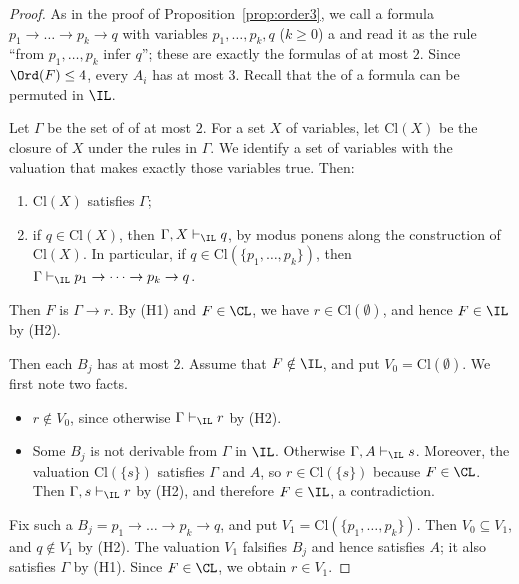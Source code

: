 \begin{proof}
As in the proof of Proposition~\ref{prop:order3}, we call a formula
$p_1\to\dots\to p_k\to q$ with variables $p_1,\dots,p_k,q$ ($k\ge0$) a
 and read it as the rule ``from $p_1,\dots,p_k$ infer
$q$''; these are exactly the formulas of  at most $2$. Since
$\Ord(F)\le4$, every $A_i$ has  at most $3$. Recall that the  of a
formula can be permuted in $\IL$.

Let $\Gamma$ be the set of  of  at most $2$. For a
set $X$ of variables, let $\mathrm{Cl}(X)$ be the closure of $X$ under the rules in
$\Gamma$. We identify a set of variables with the valuation that makes
exactly those variables true. Then:
\begin{enumerate}
\item[(H1)] $\mathrm{Cl}(X)$ satisfies $\Gamma$;
\item[(H2)] if $q\in \mathrm{Cl}(X)$, then $\Gamma,X\vdash_{\IL}q$, by modus ponens
  along the construction of $\mathrm{Cl}(X)$. In particular, if
  $q\in \mathrm{Cl}(\{p_1,\dots,p_k\})$, then $\Gamma\vdash_{\IL} p_1\to\dots\to p_k\to q$.
\end{enumerate}

Then $F$ is
$\Gamma\to r$. By (H1) and $F\in\CL$, we have $r\in \mathrm{Cl}(\emptyset)$, and hence
$F\in\IL$ by (H2).

 Then each $B_j$ has  at
most $2$. Assume that $F\notin\IL$, and put $V_0=\mathrm{Cl}(\emptyset)$. We first
note two facts.
\begin{itemize}
\item $r\notin V_0$, since otherwise $\Gamma\vdash_{\IL} r$ by (H2).
\item Some $B_j$ is not derivable from $\Gamma$ in $\IL$. Otherwise
  $\Gamma,A\vdash_{\IL} s$. Moreover, the valuation $\mathrm{Cl}(\{s\})$ satisfies
  $\Gamma$ and $A$, so $r\in \mathrm{Cl}(\{s\})$ because $F\in\CL$. Then
  $\Gamma,s\vdash_{\IL} r$ by (H2), and therefore $F\in\IL$, a contradiction.
\end{itemize}
Fix such a $B_j=p_1\to\dots\to p_k\to q$, and put
$V_1=\mathrm{Cl}(\{p_1,\dots,p_k\})$. Then $V_0\subseteq V_1$, and $q\notin V_1$ by
(H2). The valuation $V_1$ falsifies $B_j$ and hence satisfies $A$; it also
satisfies $\Gamma$ by (H1). Since $F\in\CL$, we obtain $r\in V_1$.


\end{proof}
